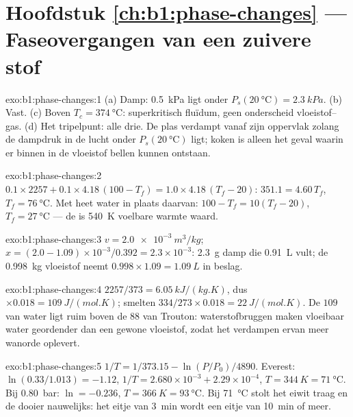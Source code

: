 \section*{Hoofdstuk \ref{ch:b1:phase-changes} --- Faseovergangen van een zuivere stof}

\begin{solution}{exo:b1:phase-changes:1}
(a) Damp: \qty{0.5}{kPa} ligt onder $P_s(\qty{20}{\degreeCelsius}) = \qty{2.3}{kPa}$.
(b) Vast. (c) Boven $T_c = \qty{374}{\degreeCelsius}$: superkritisch fluïdum, geen
onderscheid vloeistof--gas. (d) Het tripelpunt: alle drie. De plas
verdampt vanaf zijn oppervlak zolang de dampdruk in de lucht
onder $P_s(\qty{20}{\degreeCelsius})$ ligt; koken is alleen het geval waarin
er binnen in de vloeistof bellen kunnen ontstaan.
\end{solution}

\begin{solution}{exo:b1:phase-changes:2}
$0.1 \times 2257 + 0.1 \times 4.18\,(100 - T_f) = 1.0 \times 4.18\,(T_f - 20)$:
$351.1 = 4.60\,T_f$, $T_f = \qty{76}{\degreeCelsius}$. Met heet water
in plaats daarvan: $100 - T_f = 10(T_f - 20)$, $T_f = \qty{27}{\degreeCelsius}$ --- de
 is \qty{540}{K} voelbare warmte waard.
\end{solution}

\begin{solution}{exo:b1:phase-changes:3}
$v = \qty{2.0e-3}{m^3/kg}$; $x = (2.0 - 1.09) \times 10^{-3}/0.392 = 2.3 \times 10^{-3}$:
\qty{2.3}{g} damp die \qty{0.91}{L} vult; de \qty{0.998}{kg} vloeistof
neemt $0.998 \times 1.09 = \qty{1.09}{L}$ in beslag.
\end{solution}

\begin{solution}{exo:b1:phase-changes:4}
$2257/373 = \qty{6.05}{kJ/(kg.K)}$, dus $\times 0.018 = \qty{109}{J/(mol.K)}$;
smelten $334/273 \times 0.018 = \qty{22}{J/(mol.K)}$. De $109$ van water ligt ruim
boven de $88$ van Trouton: waterstofbruggen maken vloeibaar water geordender
dan een gewone vloeistof, zodat het verdampen ervan meer wanorde oplevert.
\end{solution}

\begin{solution}{exo:b1:phase-changes:5}
$1/T = 1/373.15 - \ln(P/P_0)/4890$. Everest: $\ln(0.33/1.013) = -1.12$,
$1/T = 2.680 \times 10^{-3} + 2.29 \times 10^{-4}$, $T = \qty{344}{K} =
\qty{71}{\degreeCelsius}$. Bij \qty{0.80}{bar}: $\ln = -0.236$, $T = \qty{366}{K} =
\qty{93}{\degreeCelsius}$. Bij \qty{71}{\degreeCelsius} stolt het eiwit traag
en de dooier nauwelijks: het eitje van \qty{3}{min} wordt een eitje van
\qty{10}{min} of meer.
\end{solution}

